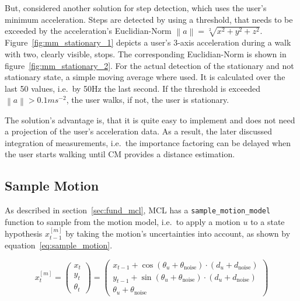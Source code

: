 But, \citet{shanklin:embedded_sensors} considered another solution for step detection, which uses the user's minimum acceleration. Steps are detected by using a threshold, that needs to be exceeded by the acceleration's Euclidian-Norm $\left\lVert a \right\rVert = \sqrt[2]{x^{2}+y^{2}+z^{2}}$. Figure~\ref{fig:mm_stationary_1} depicts a user's 3-axis acceleration during a walk with two, clearly visible, stops. The corresponding Euclidian-Norm is shown in figure~\ref{fig:mm_stationary_2}. For the actual detection of the stationary and not stationary state, a simple moving average where used. It is calculated over the last 50 values, i.e.\ by 50Hz the last second. If the threshold is exceeded $\left\lVert a \right\rVert > 0.1 ms^{-2}$, the user walks, if not, the user is stationary.

The solution's advantage is, that it is quite easy to implement and does not need a projection of the user's acceleration data. As a result, the later discussed integration of measurements, i.e.\ the importance factoring can be delayed when the user starts walking until \acs{CM} provides a distance estimation.
 


\subsection{Sample Motion}\label{sec:algo_sample_motion}
As described in section~\ref{sec:fund_mcl}, \acs{MCL} has a \texttt{sample\_motion\_model} function to sample from the motion model, i.e.\ to apply a motion $u$ to a state hypothesis $x^{[m]}_{t-1}$ by taking the motion's uncertainties into account, as shown by equation~\ref{eq:sample_motion}.

\begin{equation}\label{eq:sample_motion}
	x^{[m]}_t = \left(
    \begin{array}{c}
      x_t\\
      y_t\\
      \theta_t
    \end{array}
  \right) = \left(\begin{array}{c} x_{t-1} + \cos(\theta_u + \theta_{\text{noise}})\cdot (d_u + d_\text{noise}) \\ y_{t-1} + \sin(\theta_u + \theta_{\text{noise}})\cdot (d_u + d_\text{noise}) \\ \theta_u + \theta_{\text{noise}}
    \end{array}
  \right)
\end{equation}

